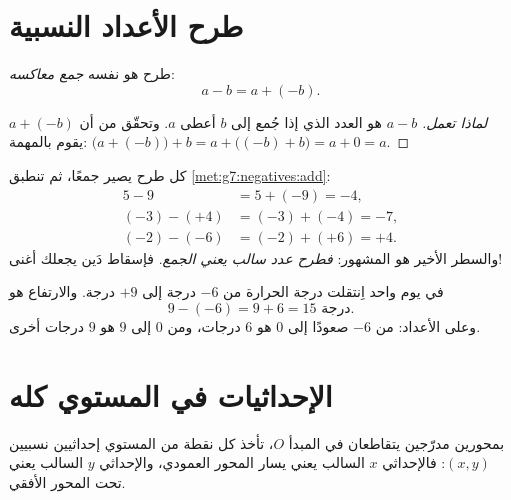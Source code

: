 \section{طرح الأعداد النسبية}

\begin{theorem}\label{thm:g7:negatives:sub}
طرح  هو نفسه \emph{جمع
معاكسه}:
\[
a - b = a + (-b) .
\]
\end{theorem}

\begin{proof}[لماذا تعمل]
$a - b$ هو العدد الذي إذا جُمع إلى $b$ أعطى $a$. وتحقّق من أن
$a + (-b)$ يقوم بالمهمة:
$\bigl(a + (-b)\bigr) + b = a + \bigl((-b) + b\bigr) = a + 0 = a$.
\end{proof}

\begin{example}\label{ex:g7:negatives:sub}
كل طرح يصير جمعًا، ثم تنطبق
\cref{met:g7:negatives:add}:
\begin{align*}
5 - 9 &= 5 + (-9) = -4, \\
(-3) - (+4) &= (-3) + (-4) = -7, \\
(-2) - (-6) &= (-2) + (+6) = +4 .
\end{align*}
والسطر الأخير هو المشهور: \emph{فطرح عدد سالب يعني
الجمع}. فإسقاط دَين يجعلك أغنى!
\end{example}

\begin{example}\label{ex:g7:negatives:temperature}
في يوم واحد اِنتقلت درجة الحرارة من $-6$ درجة إلى $+9$ درجة.
والارتفاع هو 
\[
9 - (-6) = 9 + 6 = 15 \text{ درجة}.
\]
وعلى  الأعداد: من $-6$ صعودًا إلى $0$ هو $6$ درجات، ومن $0$ إلى
$9$ هو $9$ درجات أخرى.
\end{example}

\section{الإحداثيات في المستوي كله}

\begin{definition}\label{def:g7:negatives:coords}
بمحورين مدرّجين  يتقاطعان في المبدأ $O$،
تأخذ كل نقطة من المستوي إحداثيين نسبيين $(x, y)$:
فالإحداثي $x$ السالب يعني يسار المحور العمودي، والإحداثي $y$ السالب يعني تحت
المحور الأفقي.
\end{definition}

